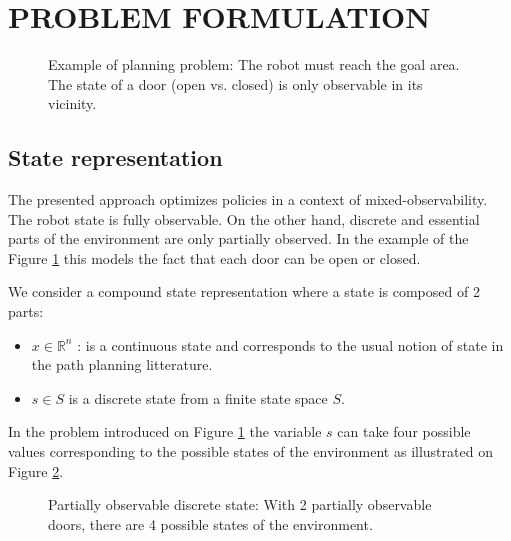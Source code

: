 \documentclass[letterpaper, 10 pt, conference]{ieeeconf}  %
\begin{document}






\section{PROBLEM FORMULATION}

\begin{figure}[!htb]
 \caption{Example of planning problem: The robot must reach the goal area. The state of a door (open vs. closed) is only observable in its vicinity. }
 \label{fig:problem}
\end{figure}

\subsection{State representation}
The presented approach optimizes policies in a context of mixed-observability. The robot state is fully observable. On the other hand, discrete and essential parts of the environment are only partially observed. In the example of the Figure \ref{fig:problem} this models the fact that each door can be open or closed.
 
We consider a compound state representation where a state is composed of 2 parts:
\begin{itemize}
\item $x \in \mathbb{R}^n$ : is a continuous state and corresponds to the usual notion of state in the path planning litterature.
\item $s \in S$ is a discrete state from a finite state space $S$.
\end{itemize}

In the problem introduced on Figure \ref{fig:problem} the variable $s$ can take four possible values corresponding to the possible states of the environment as illustrated on Figure \ref{fig:multiple_worlds}.

\begin{figure}[!htb]
 \caption{Partially observable discrete state: With 2 partially observable doors, there are 4 possible states of the environment.}
 \label{fig:multiple_worlds}
\end{figure}
\end{document}

